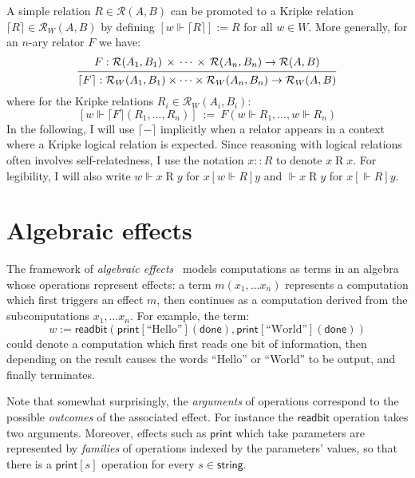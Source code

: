 \documentclass[11pt,oneside,draft]{book}
\theoremstyle{definition}
\newcommand{\kw}[1]{\ensuremath{ \mathsf{#1} }}
\newcommand{\ifr}[1]{\mathrel{[{#1}]}}
\begin{document}
A simple relation $R \in \mathcal{R}(A, B)$
can be promoted to a Kripke relation
$\lceil R \rceil \in \mathcal{R}_W(A, B)$
by defining $[w \Vdash \lceil R \rceil] := R$ for all $w \in W$.
More generally, for an $n$-ary relator $F$ we have:
\[
  \begin{prooftree}
  \hypo{
    F :
      \mathcal{R}(A_1, B_1) \,\times\,\cdots\,\times\,\mathcal{R}(A_n, B_n)
      \rightarrow \mathcal{R}(A, B)}
  \infer1{
    \lceil F \rceil :
      \mathcal{R}_W(A_1, B_1) \times \cdots \times \mathcal{R}_W(A_n, B_n)
      \rightarrow \mathcal{R}_W(A, B)}
  \end{prooftree}
\]
where for the Kripke relations $R_i \in \mathcal{R}_W(A_i, B_i)$:
\[
  [w \Vdash \lceil F \rceil (R_1, \ldots, R_n)] \: := \:
    F(w \Vdash R_1, \ldots, w \Vdash R_n)
\]
In the following,
I will use $\lceil - \rceil$ implicitly
when a relator appears in a context where
a Kripke logical relation is expected.
Since reasoning with logical relations
often involves self-relatedness,
I use the notation
$x :: R$ to denote $x \mathrel{R} x$.
For legibility, I will also write
$w \Vdash x \mathrel{R} y$ for $x \ifr{w \Vdash R} y$
and $\Vdash x \mathrel{R} y$ for $x \ifr{\Vdash R} y$.


\section{Algebraic effects} \label{sec:eff} %


The framework of \emph{algebraic effects}~\citep{effadq}
models computations as terms in an algebra
whose operations represent effects:
a term $m(x_1, \ldots x_n)$
represents a computation which first
triggers an effect $m$,
then continues as a computation derived from
the subcomputations $x_1, \ldots x_n$.
For example,
the term:
\[
  w :=
    \kw{readbit}(
      \kw{print}[\text{``Hello''}](\kw{done}),
      \kw{print}[\text{``World''}](\kw{done}))
\]
could denote a computation which
first reads one bit of information,
then depending on the result
causes the words ``Hello'' or ``World'' to be output,
and finally terminates.

Note that somewhat surprisingly,
the \emph{arguments} of operations correspond to
the possible \emph{outcomes} of the associated effect.
For instance the $\kw{readbit}$ operation takes two arguments.
Moreover,
effects such as $\kw{print}$
which take parameters
are represented by \emph{families}
of operations indexed by the parameters' values,
so that there is a $\kw{print}[s]$
operation for every $s \in \kw{string}$.
\end{document}
